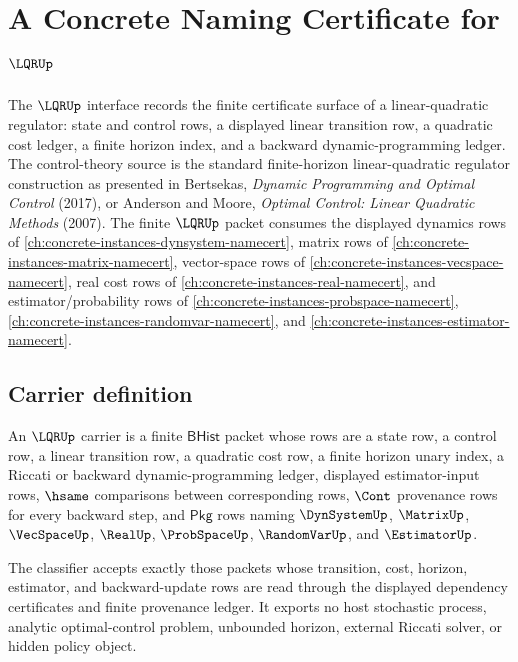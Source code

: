 \chapter{A Concrete Naming Certificate for $\LQRUp$}
\label{ch:concrete-instances-lqr-namecert}

The $\LQRUp$ interface records the finite certificate surface of a linear-quadratic regulator: state and control rows, a displayed linear transition row, a quadratic cost ledger, a finite horizon index, and a backward dynamic-programming ledger. The control-theory source is the standard finite-horizon linear-quadratic regulator construction as presented in Bertsekas, \emph{Dynamic Programming and Optimal Control} (2017), or Anderson and Moore, \emph{Optimal Control: Linear Quadratic Methods} (2007). The finite $\LQRUp$ packet consumes the displayed dynamics rows of \autoref{ch:concrete-instances-dynsystem-namecert}, matrix rows of \autoref{ch:concrete-instances-matrix-namecert}, vector-space rows of \autoref{ch:concrete-instances-vecspace-namecert}, real cost rows of \autoref{ch:concrete-instances-real-namecert}, and estimator/probability rows of \autoref{ch:concrete-instances-probspace-namecert}, \autoref{ch:concrete-instances-randomvar-namecert}, and \autoref{ch:concrete-instances-estimator-namecert}.

\section{Carrier definition}
\label{sec:lqr-carrier}

\begin{definition}
\label{def:lqr-finite-control-carrier}
An $\LQRUp$ carrier is a finite $\mathsf{BHist}$ packet whose rows are a state row, a control row, a linear transition row, a quadratic cost row, a finite horizon unary index, a Riccati or backward dynamic-programming ledger, displayed estimator-input rows, $\hsame$ comparisons between corresponding rows, $\Cont$ provenance rows for every backward step, and $\mathsf{Pkg}$ rows naming $\DynSystemUp$, $\MatrixUp$, $\VecSpaceUp$, $\RealUp$, $\ProbSpaceUp$, $\RandomVarUp$, and $\EstimatorUp$.

The classifier accepts exactly those packets whose transition, cost, horizon, estimator, and backward-update rows are read through the displayed dependency certificates and finite provenance ledger. It exports no host stochastic process, analytic optimal-control problem, unbounded horizon, external Riccati solver, or hidden policy object.
\end{definition}

